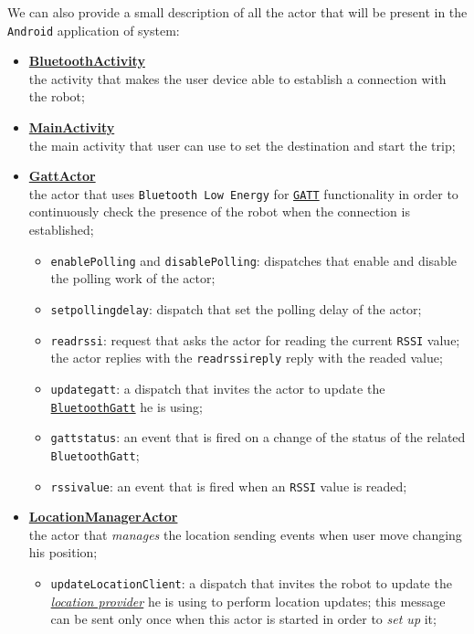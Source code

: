 We can also provide a small description of all the actor that will be present in the \texttt{Android} application of \gitberto system:
\begin{itemize}
	\item \underline{\textbf{BluetoothActivity}}\\
	the activity that makes the user device able to establish a connection with the robot;
	
	 \item \underline{\textbf{MainActivity}}\\
	 the main activity that user can use to set the destination and start the trip;
	 
	 \item \underline{\textbf{GattActor}}\\
	 the actor that uses \texttt{Bluetooth Low Energy} for \href{https://en.wikipedia.org/wiki/Bluetooth_Low_Energy#GATT_operations}{\texttt{GATT}} functionality in order to continuously check the presence of the robot when the connection is established;
	 \begin{itemize}
	 	\item \texttt{enablePolling} and \texttt{disablePolling}: dispatches that enable and disable the polling work of the actor;
	 	
	 	\item \texttt{setpollingdelay}: dispatch that set the polling delay of the actor;
	 	
	 	\item \texttt{readrssi}: request that asks the actor for reading the current \texttt{RSSI} value; the actor replies with the \texttt{readrssireply} reply with the readed value;
	 	
	 	\item \texttt{updategatt}: a dispatch that invites the actor to update the \href{https://developer.android.com/reference/android/bluetooth/BluetoothGatt}{\texttt{BluetoothGatt}} he is using;
	 	
	 	\item \textcolor{BrickRed}{\texttt{gattstatus}}: an event that is fired on a change of the status of the related \texttt{BluetoothGatt};
	 	
	 	\item \textcolor{BrickRed}{\texttt{rssivalue}}: an event that is fired when an \texttt{RSSI} value is readed;
	 \end{itemize}
	 
	 \item \underline{\textbf{LocationManagerActor}}\\
	 the actor that \textit{manages} the location sending events when user move changing his position;
	 \begin{itemize}
	 	\item \texttt{updateLocationClient}: a dispatch that invites the robot to update the \href{https://developers.google.com/android/reference/com/google/android/gms/location/FusedLocationProviderClient}{\textit{location provider}} he is using to perform location updates; this message can be sent only once when this actor is started in order to \textit{set up} it;
	 	

\end{itemize}
\end{itemize}

